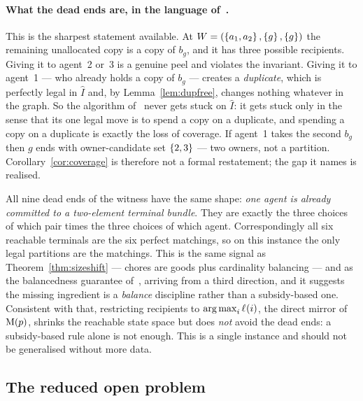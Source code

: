 \paragraph{What the dead ends are, in the language of~\cite{BKNS22}.}
This is the sharpest statement available. At
$W = (\left\{a_1,a_2\right\},\left\{g\right\},\left\{g\right\})$ the remaining unallocated copy
is a copy of $b_g$, and it has three possible recipients. Giving it to agent~2
or~3 is a genuine peel and violates the invariant. Giving it to agent~1 --- who
already holds a copy of $b_g$ --- creates a \emph{duplicate}, which is perfectly
legal in $\hat{I}$ and, by Lemma~\ref{lem:dupfree}, changes nothing whatever in
the graph. So the algorithm of~\cite{BKNS22} never gets stuck on $\hat{I}$: it
gets stuck only in the sense that its one legal move is to spend a copy on a
duplicate, and spending a copy on a duplicate is exactly the loss of coverage.
If agent~1 takes the second $b_g$ then $g$ ends with owner-candidate set
$\left\{2,3\right\}$ --- two owners, not a partition. Corollary~\ref{cor:coverage} is
therefore not a formal restatement; the gap it names is realised.

\begin{remark}
\label{rem:balance}
All nine dead ends of the witness have the same shape: \emph{one agent is
already committed to a two-element terminal bundle}. They are exactly the three
choices of which pair times the three choices of which agent. Correspondingly
all six reachable terminals are the six perfect matchings, so on this instance
the only legal partitions are the matchings. This is the same signal as
Theorem~\ref{thm:sizeshift} --- chores are goods plus cardinality balancing ---
and as the balancedness guarantee of~\cite{BDNSV20}, arriving from a third
direction, and it suggests the missing ingredient is a \emph{balance}
discipline rather than a subsidy-based one. Consistent with that, restricting
recipients to $\operatorname*{arg\,max}_i \ell_{}(i)$, the direct mirror of $\mathrm{M}(p)$,
shrinks the reachable state space but does \emph{not} avoid the dead ends: a
subsidy-based rule alone is not enough. This is a single instance and should not
be generalised without more data.
\end{remark}

\subsection{The reduced open problem}
\label{sec:h1prime}

